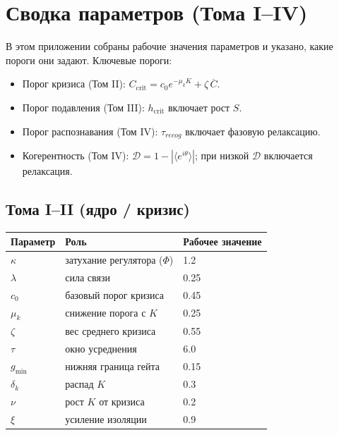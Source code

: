 \section*{Сводка параметров (Тома I--IV)}
В этом приложении собраны рабочие значения параметров и указано, какие пороги они задают.
Ключевые пороги:
\begin{itemize}
    \item Порог кризиса (Том II): $C_{\mathrm{crit}} = c_0 e^{-\mu_k K} + \zeta\,\overline{C}$.
    \item Порог подавления (Том III): $h_{\mathrm{crit}}$ включает рост $S$.
    \item Порог распознавания (Том IV): $\tau_{recog}$ включает фазовую релаксацию.
    \item Когерентность (Том IV): $\mathcal{D}=1-|\langle e^{i\theta}\rangle|$; при низкой $\mathcal{D}$ включается релаксация.
\end{itemize}

\subsection*{Тома I--II (ядро / кризис)}
\begin{tabular}{lll}
\toprule
Параметр & Роль & Рабочее значение \\
\midrule
$\kappa$ & затухание регулятора ($\Phi$) & 1.2 \\
$\lambda$ & сила связи & 0.25 \\
$c_0$ & базовый порог кризиса & 0.45 \\
$\mu_k$ & снижение порога с $K$ & 0.25 \\
$\zeta$ & вес среднего кризиса & 0.55 \\
$\tau$ & окно усреднения & 6.0 \\
$g_{\min}$ & нижняя граница гейта & 0.15 \\
$\delta_k$ & распад $K$ & 0.3 \\
$\nu$ & рост $K$ от кризиса & 0.2 \\
$\xi$ & усиление изоляции & 0.9 \\
\bottomrule
\end{tabular}

